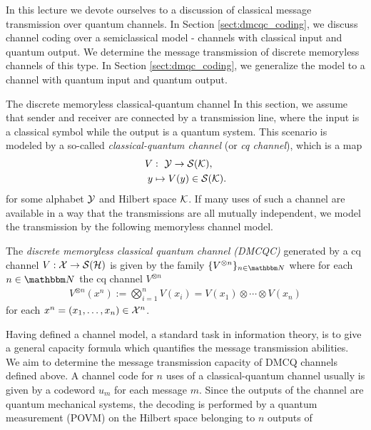 In this lecture we devote ourselves to a discussion of classical message transmission over quantum channels. In 
Section \ref{sect:dmcqc_coding}, we discuss channel coding over a semiclassical model - channels with classical input and quantum output. We determine the message transmission of discrete memoryless channels of this type. \newline 
In Section \ref{sect:dmqc_coding}, we generalize the model to a channel with quantum input and quantum output. 
\begin{section}{The discrete memoryless  classical-quantum channel} \label{sect:dmcqc_coding}
	In this section, we assume that sender and receiver are connected  by a transmission line, where the input is a classical symbol while the output is a quantum system. This scenario is modeled by a so-called \emph{classical-quantum channel} (or \emph{cq channel}), which is a map
	\begin{align*}
	V&: \ {\mathcal Y} \rightarrow {\mathcal S}({\mathcal K}),  \\
	y&	 \mapsto V(y) \in {\mathcal S}({\mathcal K}).
	\end{align*}
	for some alphabet ${\mathcal Y}$ and Hilbert space ${\mathcal K}$.
	If many uses of such a channel are available in a way that the transmissions are all mutually independent, we model the transmission by the following memoryless channel model.
	\begin{definition} 
		The \emph{discrete memoryless classical quantum channel (DMCQC)} generated by a cq channel $V: {\mathcal X} \rightarrow {\mathcal S}({\mathcal H})$ is given by the family $\{V^{\otimes n}\}_{n \in \bbmN}$
		where for each $n \in \bbmN$ the cq channel $V^{\otimes n}$ 
		\begin{align*}
		V^{\otimes n}(x^n) := \bigotimes_{i=1}^n V(x_i) = V(x_1) \otimes \cdots \otimes V(x_n)
		\end{align*}
		for each $x^n = (x_1,\dots,x_n) \in {\mathcal X}^n$.
	\end{definition}
	Having defined a channel model, a standard task in information theory, is to give a general capacity formula which quantifies the message transmission abilities. We aim to determine the message transmission capacity of DMCQ channels defined above. \newline 
	A channel code for $n$ uses of a classical-quantum channel usually is given 
	by a codeword $u_m$ for each message $m$. Since the outputs of the channel are quantum mechanical systems, the decoding is performed by a quantum measurement (POVM) on the Hilbert space belonging to $n$ outputs of

\end{section}
